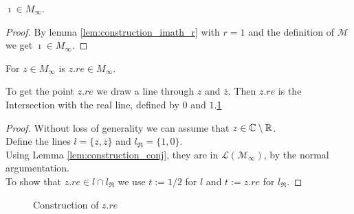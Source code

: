 \begin{corollary}
    \label{cor:construction_imath}
    \leanok
    $\imath \in M_{\infty}$.
\end{corollary}
\begin{proof}
    By lemma \ref{lem:construction_imath_r} with $r = 1$ and the definition of $\mathcal{M}$ we get $\imath \in M_{\infty}$.
\end{proof}

\begin{lemma}
    \label{lem:construction_real}
    \leanok
    For $z \in M_{\infty}$ is $z.re \in M_{\infty}$.
\end{lemma}
To get the point $z.re$ we draw a line through $z$ and $\overline{z}$. Then $z.re$ is the Intersection with the real line, defined by $0$ and $1$.\ref{Fig z.re}
\begin{proof}
    Without loss of generality we can assume that $z \in \mathbb{C}\setminus\mathbb{R}$.\\
    Define the lines $l = \{z, \overline{z}\}$ and $l_{\Re} = \{1, 0\}$.\\
    Using Lemma \ref{lem:construction_conj}, they are in $\mathcal{L(M_{\infty})}$, by the normal argumentation.\\
    To show that $z.re \in l \cap l_{\Re}$ we use $t:= 1/2$ for $l$ and $t:= z.re$ for $l_{\Re}$.
\end{proof}
\begin{figure}
    \centering
    \caption{Construction of $z.re$}
    \label{Fig z.re}
\end{figure}

